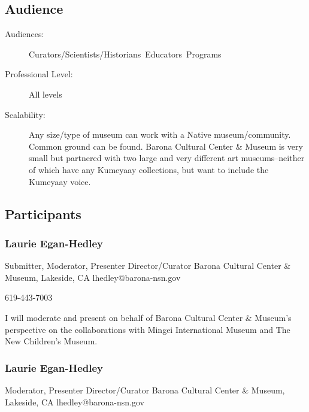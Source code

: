 \documentclass{report}
\begin{document}
              \subsection*{Audience}
                \begin{description}
                  \item [Audiences:]Curators/Scientists/Historians~Educators~Programs~
                  \item[Professional Level:]All levels~
                \item[Scalability:] Any size/type of museum can work with a Native museum/community.  Common ground can be found.  Barona Cultural Center \& Museum is very small but partnered with two large and very different art museums--neither of which have any Kumeyaay collections, but want to include the Kumeyaay voice.    

							
              \end{description}
            \subsection*{Participants}
              \subsubsection*{ Laurie Egan-Hedley }
              Submitter, Moderator, Presenter\newline
              Director/Curator\newline
              Barona Cultural Center \& Museum, Lakeside, CA
              \newline
              lhedley@barona-nsn.gov\newline
              
              619-443-7003\newline

              I will moderate and present on behalf of Barona Cultural Center \& Museum's perspective on the collaborations with Mingei International Museum and The New Children's Museum.\newline


              
                \subsubsection*{ Laurie Egan-Hedley }
                Moderator, Presenter\newline
                Director/Curator\newline
                Barona Cultural Center \& Museum, Lakeside, CA
                \newline
                lhedley@barona-nsn.gov\newline
                
\end{document}
